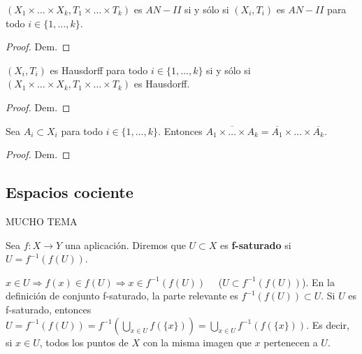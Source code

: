 \begin{nprop}
  $(X_1 \times \dots \times X_k, T_1 \times \dots \times T_k)$ es $AN-II$ si y sólo si $(X_i,T_i)$ es $AN-II$ para todo $i \in \{1, \dots, k\}$.
\end{nprop}
\begin{proof}
    Dem.
\end{proof}

\begin{nprop}
  $(X_i,T_i)$ es Hausdorff para todo $i \in \{1, \dots, k\}$ si y sólo si $(X_1 \times \dots \times X_k, T_1 \times \dots \times T_k)$ es Hausdorff.
\end{nprop}
\begin{proof}
    Dem.
\end{proof}

\begin{lema}
  Sea $A_i \subset X_i$ para todo $i \in \{1, \dots, k\}$. Entonces $\overline{A_1 \times \dots \times A_k} = \overline{A_1} \times \dots \times \overline{A_k}$.
\end{lema}
\begin{proof}
    Dem.
\end{proof}

\subsection{Espacios cociente}
MUCHO TEMA


\begin{ndef}
  Sea $f: X \to Y$ una aplicación. Diremos que $U \subset X$ es \textbf{f-saturado} si $U=f^{-1}(f(U))$.
\end{ndef}
$x \in U \Rightarrow f(x) \in f(U) \Rightarrow x \in f^{-1}(f(U)) \quad$ ($U \subset f^{-1}(f(U))$). En la definición de conjunto f-saturado, la parte relevante es $f^{-1}(f(U)) \subset U$. Si $U$ es f-saturado, entonces $U=f^{-1}(f(U))=f^{-1}\left( \bigcup_{x \in U} f(\{x\}) \right) = \bigcup_{x \in U} f^{-1}\left( f(\{x\}) \right)$. Es decir, si $x \in U$, todos los puntos de $X$ con la misma imagen que $x$ pertenecen a $U$.

